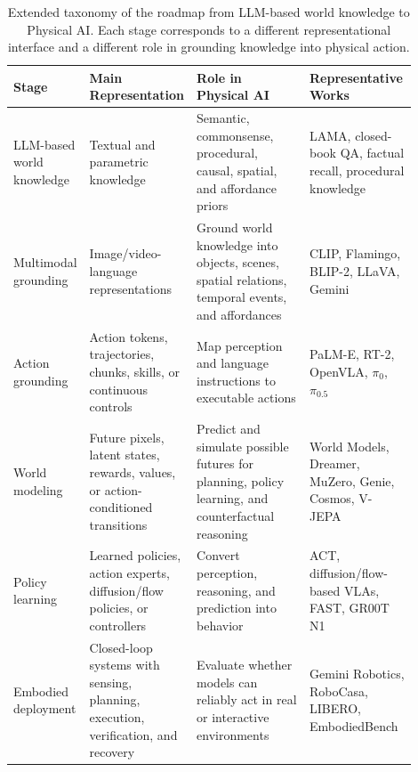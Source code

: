\begin{table}[t]
\centering
\small
\begin{tabular}{p{0.15\linewidth}p{0.22\linewidth}p{0.30\linewidth}p{0.23\linewidth}}
\toprule
Stage & Main Representation & Role in Physical AI & Representative Works \\
\midrule
LLM-based world knowledge 
& Textual and parametric knowledge
& Semantic, commonsense, procedural, causal, spatial, and affordance priors
& LAMA, closed-book QA, factual recall, procedural knowledge~\citep{petroni2019language,roberts2020knowledge,kandpal2023longtail,ruis2025procedural} \\
\midrule
Multimodal grounding 
& Image/video-language representations
& Ground world knowledge into objects, scenes, spatial relations, temporal events, and affordances
& CLIP, Flamingo, BLIP-2, LLaVA, Gemini~\citep{radford2021learning,alayrac2022flamingo,li2023blip,liu2023llava,team2023gemini} \\
\midrule
Action grounding 
& Action tokens, trajectories, chunks, skills, or continuous controls
& Map perception and language instructions to executable actions
& PaLM-E, RT-2, OpenVLA, $\pi_0$, $\pi_{0.5}$~\citep{driess2023palm,zitkovich2023rt,kim2024openvla,black2024pi0,physicalintelligence2025pi05} \\
\midrule
World modeling 
& Future pixels, latent states, rewards, values, or action-conditioned transitions
& Predict and simulate possible futures for planning, policy learning, and counterfactual reasoning
& World Models, Dreamer, MuZero, Genie, Cosmos, V-JEPA~\citep{ha2018world,hafner2020dreamer,schrittwieser2020mastering,bruce2024genie,agarwal2025cosmos,bardes2024vjepa} \\
\midrule
Policy learning 
& Learned policies, action experts, diffusion/flow policies, or controllers
& Convert perception, reasoning, and prediction into behavior
& ACT, diffusion/flow-based VLAs, FAST, GR00T N1~\citep{act,pertsch2025fast,bjorck2025gr00tn1,rdt1b2025} \\
\midrule
Embodied deployment 
& Closed-loop systems with sensing, planning, execution, verification, and recovery
& Evaluate whether models can reliably act in real or interactive environments
& Gemini Robotics, RoboCasa, LIBERO, EmbodiedBench~\citep{team2025gemini1,team2025gemini15,nasiriany2024robocasa,liu2023libero,yang2025embodiedbench} \\
\bottomrule
\end{tabular}
\caption{Extended taxonomy of the roadmap from LLM-based world knowledge to Physical AI. Each stage corresponds to a different representational interface and a different role in grounding knowledge into physical action.}
\label{tab:roadmap-taxonomy}
\end{table}

